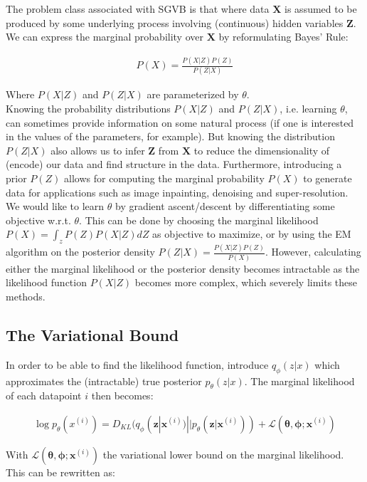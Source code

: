 \documentclass{article}
\begin{document}
The problem class associated with SGVB is that where data $\mathbf{X}$ is assumed to be produced by some underlying process involving (continuous) hidden variables $\mathbf{Z}$. We can express the marginal probability over $\mathbf{X}$ by reformulating Bayes' Rule:

\begin{align}
P(X) = \frac{P(X|Z)P(Z)}{P(Z|X)}
\end{align}

Where $P(X|Z)$ and $P(Z|X)$ are parameterized by $\theta$.
\\

Knowing the probability distributions $P(X|Z)$ and $P(Z|X)$, i.e. learning $\theta$, can sometimes provide information on some natural process (if one is interested in the values of the parameters, for example). But knowing the distribution $P(Z|X)$ also allows us to infer $\mathbf{Z}$ from $\mathbf{X}$ to reduce the dimensionality of (encode) our data and find structure in the data. Furthermore, introducing a prior $P(Z)$ allows for computing the marginal probability $P(X)$ to generate data for applications such as image inpainting, denoising and super-resolution.
We would like to learn $\theta$ by gradient ascent/descent by differentiating some objective w.r.t. $\theta$. This can be done by choosing the marginal likelihood $P(X) = \int_z P(Z) P(X|Z) dZ$ as objective to maximize, or by using the EM algorithm on the posterior density $ P(Z|X) = \frac{P(X|Z)P(Z)}{P(X)}$. However, calculating either  the marginal likelihood or the posterior density becomes intractable as the likelihood function $P(X|Z)$ becomes more complex, which severely limits these methods.

\subsection{The Variational Bound}

In order to be able to find the likelihood function, \cite{kingma2013auto} introduce $q_\phi(z|x)$ which approximates the (intractable) true posterior $p_\theta(z|x)$. The marginal likelihood of each datapoint $i$ then becomes:

\begin{align}
	\log p_\theta(x^{(i)}) = D_{KL}(q_\phi(\mathbf{z}|\mathbf{x}^{(i)}) || p_\theta(\mathbf{z}|\mathbf{x}^{(i)})) + \mathcal{L}(\mathbf{\theta}, \mathbf{\phi}; \mathbf{x}^{(i)})
\end{align} 

With $\mathcal{L}(\mathbf{\theta}, \mathbf{\phi}; \mathbf{x}^{(i)})$ the variational lower bound on the marginal likelihood. This can be rewritten as:
\end{document}
